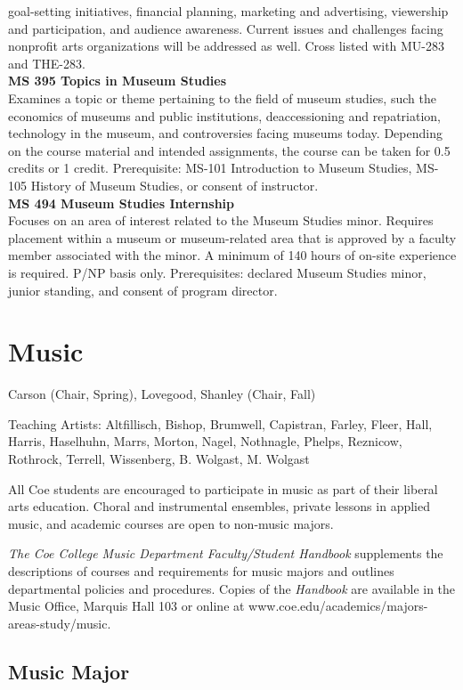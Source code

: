 \documentclass[
  letterpaper,
]{scrbook}
\begin{document}
goal-setting initiatives, financial planning, marketing and advertising,
viewership and participation, and audience awareness. Current issues and
challenges facing nonprofit arts organizations will be addressed as
well. Cross listed with MU-283 and THE-283.\\
\textbf{MS 395 Topics in Museum Studies}\\
Examines a topic or theme pertaining to the field of museum studies,
such the economics of museums and public institutions, deaccessioning
and repatriation, technology in the museum, and controversies facing
museums today. Depending on the course material and intended
assignments, the course can be taken for 0.5 credits or 1 credit.
Prerequisite: MS-101 Introduction to Museum Studies, MS-105 History of
Museum Studies, or consent of instructor.\\
\textbf{MS 494 Museum Studies Internship}\\
Focuses on an area of interest related to the Museum Studies minor.
Requires placement within a museum or museum-related area that is
approved by a faculty member associated with the minor. A minimum of 140
hours of on-site experience is required. P/NP basis only. Prerequisites:
declared Museum Studies minor, junior standing, and consent of program
director.

\section{Music}\label{sec-music}

Carson (Chair, Spring), Lovegood, Shanley (Chair, Fall)

Teaching Artists: Altfillisch, Bishop, Brumwell, Capistran, Farley,
Fleer, Hall, Harris, Haselhuhn, Marrs, Morton, Nagel, Nothnagle, Phelps,
Reznicow, Rothrock, Terrell, Wissenberg, B. Wolgast, M. Wolgast

All Coe students are encouraged to participate in music as part of their
liberal arts education. Choral and instrumental ensembles, private
lessons in applied music, and academic courses are open to non-music
majors.

\emph{The Coe College Music Department Faculty/Student Handbook}
supplements the descriptions of courses and requirements for music
majors and outlines departmental policies and procedures. Copies of the
\emph{Handbook} are available in the Music Office, Marquis Hall 103 or
online at www.coe.edu/academics/majors-areas-study/music.

\subsection{Music Major}\label{music-major}
\end{document}
